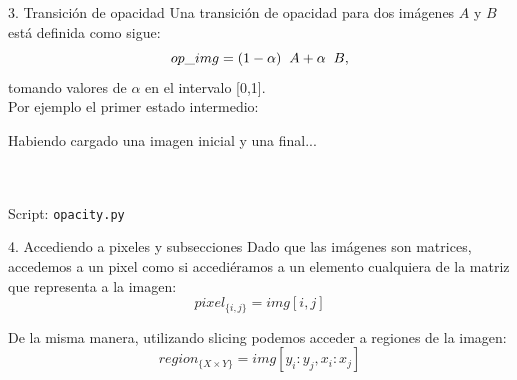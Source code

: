 \documentclass[usenames,dvipsnames]{beamer}
\begin{document}
  \begin{frame}{3. Transición de opacidad}
    Una transición de opacidad para dos imágenes $A$ y $B$ está definida como
    sigue:
    $$op\_img = (1 - \alpha) \hspace*{0.2cm} A + \alpha \hspace*{0.2cm} B,$$
    tomando valores de $\alpha$ en el intervalo [0,1].\\
    \vspace*{0.3cm}
    Por ejemplo el primer estado intermedio:
    \vspace*{0.3cm}
    \begin{block}{Habiendo cargado una imagen inicial y una final...}
      \\
      \\
      \\
      \vspace*{0.5cm}
    \end{block}
    Script: \texttt{opacity.py}
  \end{frame}

  \begin{frame}{4. Accediendo a pixeles y subsecciones}
    Dado que las imágenes son matrices, accedemos a un pixel como si accediéramos
    a un elemento cualquiera de la matriz que representa a la imagen:
    $$pixel_{\{i,j\}} = img[i,j]$$

    De la misma manera, utilizando slicing podemos acceder a regiones de la
    imagen:
    $$region_{\{X\times Y\}} = img[y_i:y_j, x_i:x_j]$$
  \end{frame}
\end{document}
